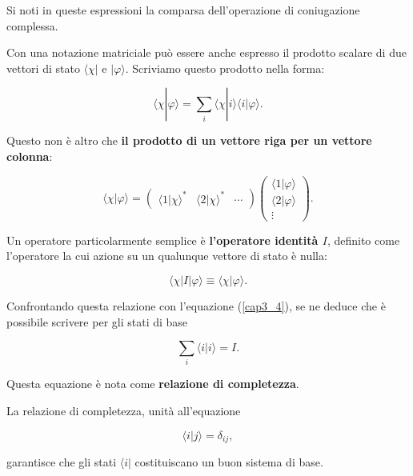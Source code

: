 Si noti in queste espressioni la comparsa dell'operazione di coniugazione complessa.

Con una notazione matriciale può essere anche espresso il prodotto scalare di due vettori di stato $\langle \chi |$ e $ | \varphi \rangle $. Scriviamo questo prodotto nella forma:

\begin{equation}
\langle \chi | \varphi \rangle = \sum \limits_{i} \langle \chi | i \rangle \langle i | \varphi \rangle .
\end{equation}

Questo non è altro che \textbf{il prodotto di un vettore riga per un vettore colonna}:

\begin{equation}
\langle \chi | \varphi \rangle = 
\begin{pmatrix}
\langle 1 | \chi \rangle ^* & \langle 2 | \chi \rangle ^* & \cdots 
\end{pmatrix} 
\begin{pmatrix}
\langle 1 | \varphi \rangle \\ 
\langle 2 | \varphi \rangle 
\\ \vdots 
\end{pmatrix} .
\end{equation}

Un operatore particolarmente semplice è \textbf{l'operatore identità $I$}, definito come l'operatore la cui azione su un qualunque vettore di stato è nulla:

\begin{equation}
\langle \chi | I | \varphi \rangle \equiv \langle \chi | \varphi \rangle .
\end{equation}

Confrontando questa relazione con l'equazione (\ref{cap3_4}), se ne deduce che è possibile scrivere per gli stati di base

\begin{equation}
\sum \limits_{i} \langle i | i \rangle = I .
\end{equation}

Questa equazione è nota come \textbf{relazione di completezza}.

La relazione di completezza, unità all'equazione

\begin{equation}
\langle i | j \rangle =\delta_{ij} ,
\end{equation}

garantisce che gli stati $\langle i | $ costituiscano un buon sistema di base.


